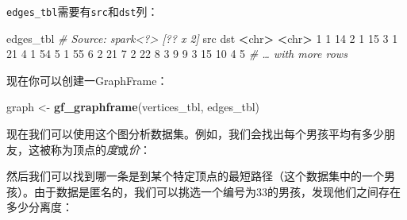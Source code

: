 \documentclass[
]{article}
\newenvironment{Shaded}{\begin{snugshade}}{\end{snugshade}}
\newcommand{\CommentTok}[1]{\textcolor[rgb]{0.56,0.35,0.01}{\textit{#1}}}
\newcommand{\DataTypeTok}[1]{\textcolor[rgb]{0.13,0.29,0.53}{#1}}
\newcommand{\DecValTok}[1]{\textcolor[rgb]{0.00,0.00,0.81}{#1}}
\newcommand{\ErrorTok}[1]{\textcolor[rgb]{0.64,0.00,0.00}{\textbf{#1}}}
\newcommand{\FloatTok}[1]{\textcolor[rgb]{0.00,0.00,0.81}{#1}}
\newcommand{\KeywordTok}[1]{\textcolor[rgb]{0.13,0.29,0.53}{\textbf{#1}}}
\newcommand{\NormalTok}[1]{#1}
\newcommand{\OperatorTok}[1]{\textcolor[rgb]{0.81,0.36,0.00}{\textbf{#1}}}
\newcommand{\StringTok}[1]{\textcolor[rgb]{0.31,0.60,0.02}{#1}}
\begin{document}
\texttt{edges\_tbl}需要有\texttt{src}和\texttt{dst}列：

\begin{Shaded}
\begin{Highlighting}[]
\NormalTok{edges_tbl}
\CommentTok{# Source: spark<?> [?? x 2]}
\NormalTok{ src dst}
 \OperatorTok{<}\NormalTok{chr}\OperatorTok{>}\StringTok{ }\ErrorTok{<}\NormalTok{chr}\OperatorTok{>}
\StringTok{ }\DecValTok{1} \DecValTok{1} \DecValTok{14}
 \DecValTok{2} \DecValTok{1} \DecValTok{15}
 \DecValTok{3} \DecValTok{1} \DecValTok{21}
 \DecValTok{4} \DecValTok{1} \DecValTok{54}
 \DecValTok{5} \DecValTok{1} \DecValTok{55}
 \DecValTok{6} \DecValTok{2} \DecValTok{21}
 \DecValTok{7} \DecValTok{2} \DecValTok{22}
 \DecValTok{8} \DecValTok{3} \DecValTok{9}
 \DecValTok{9} \DecValTok{3} \DecValTok{15}
\DecValTok{10} \DecValTok{4} \DecValTok{5}
\CommentTok{# … with more rows}
\end{Highlighting}
\end{Shaded}

现在你可以创建一GraphFrame：

\begin{Shaded}
\begin{Highlighting}[]
\NormalTok{graph <-}\StringTok{ }\KeywordTok{gf_graphframe}\NormalTok{(vertices_tbl, edges_tbl)}
\end{Highlighting}
\end{Shaded}

现在我们可以使用这个图分析数据集。例如，我们会找出每个男孩平均有多少朋友，这被称为顶点的\emph{度}或\emph{价}：

\begin{Shaded}
\end{Shaded}

然后我们可以找到哪一条是到某个特定顶点的最短路径（这个数据集中的一个男孩）。由于数据是匿名的，我们可以挑选一个编号为33的男孩，发现他们之间存在多少分离度：
\end{document}
